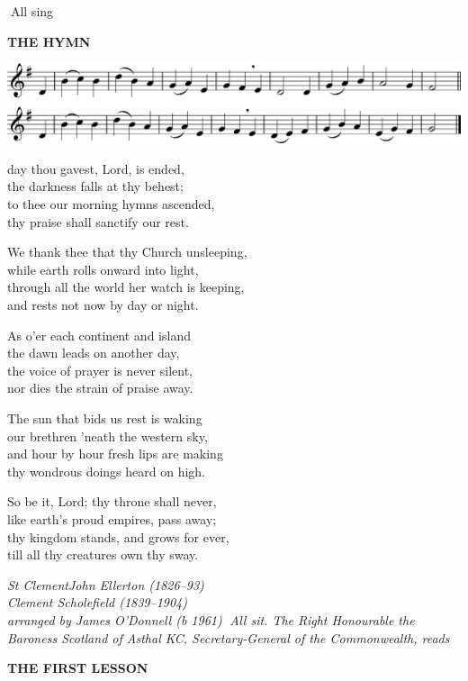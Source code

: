 All sing

\begin{center}
	\bfseries\color{qred}THE HYMN

\includegraphics[width=.8\textwidth]{hymn1.png}

\color{black}\normalfont
{} day thou gavest, Lord, is ended,\\
the darkness falls at thy behest;\\
to thee our morning hymns ascended,\\
thy praise shall sanctify our rest.

We thank thee that thy Church unsleeping,\\
while earth rolls onward into light,\\
through all the world her watch is keeping,\\
and rests not now by day or night.

As o’er each continent and island\\
the dawn leads on another day,\\
the voice of prayer is never silent,\\
nor dies the strain of praise away.

The sun that bids us rest is waking\\
our brethren ’neath the western sky,\\
and hour by hour fresh lips are making\\
thy wondrous doings heard on high.

So be it, Lord; thy throne shall never,\\
like earth’s proud empires, pass away;\\
thy kingdom stands, and grows for ever,\\ 
till all thy creatures own thy sway.
\end{center}

{\color{qred}\itshape St Clement\hfill John Ellerton (1826–93)\\
Clement Scholefield (1839–1904)\\
arranged by James O’Donnell (b 1961)
}
{\color{qred}\itshape All sit. The Right Honourable the Baroness Scotland of Asthal KC, Secretary-General of the
Commonwealth, reads}

\begin{center}\bfseries\color{qred}
	THE FIRST LESSON

\end{center}

